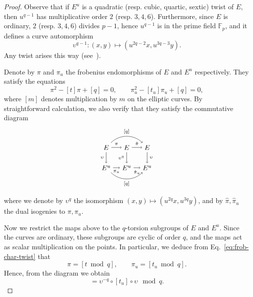 \documentclass[12pt]{article}
\theoremstyle{plain}
\theoremstyle{definition}
\def\F{\ensuremath{\mathbb{F}}}
\begin{document}
\begin{proof}
  Observe that if $E^u$ is a quadratic (resp. cubic, quartic, sextic)
  twist of $E$, then $u^{q-1}$ has multiplicative order $2$
  (resp. $3,4,6$). Furthermore, since $E$ is ordinary, $2$
  (resp. $3,4,6$) divides $p-1$, hence $u^{q-1}$ is in the prime field
  $\F_p$, and it defines a curve automorphism
  \begin{equation*}
    \upsilon^{q-1}:(x,y)\mapsto(u^{2q-2}x,u^{3q-3}y).
  \end{equation*}
  Any twist arises this way (see~\cite{Sil}).

  Denote by $\pi$ and $\pi_u$ the frobenius endomorphisms of $E$
  and $E^u$ respectively. They satisfy the equations
  \begin{equation}
    \label{eq:frob-char-twist}
    \pi^2 - [t]\pi + [q] = 0, \qquad \pi_u^2 - [t_u]\pi_u + [q] = 0,
  \end{equation}
  where $[m]$ denotes multiplication by $m$ on the elliptic curves. By
  straightforward calculation, we also verify that they satisfy the
  commutative diagram
  \begin{equation*}
    \begin{tikzpicture}[node distance=3em]
      \node(E){$E$};
      \node[right of=E](E2){$E$};
      \node[right of=E2](E3){$E$};
      \node[below of=E](Eu){$E^u$};
      \node[right of=Eu](Eu2){$E^u$};
      \node[right of=Eu2](Eu3){$E^u$};

      \draw[->,auto,font=\scriptsize]
      (E) edge node[swap]{$\upsilon$} (Eu)
          edge node{$\pi$} (E2)
          edge[bend left=45] node{$[q]$} (E3)
      (Eu) edge node[swap]{$\pi_u$} (Eu2)
           edge[bend right=45] node[swap]{$[q]$} (Eu3)
      (E2) edge node[swap]{$\upsilon^q$} (Eu2)
           edge node{$\hat\pi$} (E3)
      (Eu2) edge node[swap]{$\hat\pi_u$} (Eu3)
      (E3) edge node{$\upsilon$} (Eu3);
    \end{tikzpicture}
  \end{equation*}
  where we denote by $\upsilon^q$ the isomorphism
  $(x,y)\mapsto(u^{2q}x,u^{3q}y)$, and by $\hat\pi,\hat\pi_u$ the dual isogenies
  to $\pi,\pi_u$.

  Now we restrict the maps above to the $q$-torsion subgroups of $E$
  and $E^u$. Since the curves are ordinary, these subgroups are cyclic
  of order $q$, and the maps act as scalar multiplication on the
  points. In particular, we deduce from Eq.~\eqref{eq:frob-char-twist} that 
  \begin{equation*}
    \pi = [t \bmod q], \qquad \pi_u = [t_u \bmod q].
  \end{equation*}
  Hence, from the diagram we obtain
  \begin{equation*}
    [t] = \upsilon^{-q}\circ[t_u]\circ\upsilon \mod q.
  \end{equation*}


\end{proof}
\end{document}

